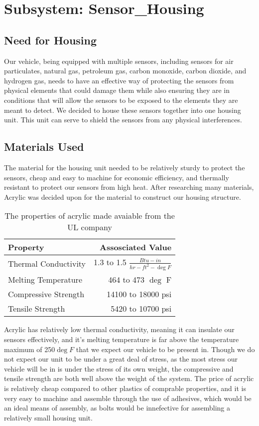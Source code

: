 \chapter{Subsystem: Sensor\_Housing}

\section{Need for Housing} Our vehicle, being equipped with multiple sensors, including sensors for air particulates, natural gas, petroleum gas, carbon monoxide, carbon dioxide, and hydrogen gas, needs to have an effective way of protecting the sensors from physical elements that could damage them while also ensuring they are in conditions that will allow the sensors to be exposed to the elements they are meant to detect. We decided to house these sensors together into one housing unit. This unit can serve to shield the sensors from any physical interferences.

\section{Materials Used} The material for the housing unit needed to be relatively sturdy to protect the sensors, cheap and easy to machine for economic efficiency, and thermally resistant to protect our sensors from high heat. After researching many materials, Acrylic was decided upon for the material to construct our housing structure.

\begin{table}
\centering
\begin{tabular}{l|r}
Property & Assosciated Value \\\hline
Thermal Conductivity & 1.3 to 1.5 $\frac{Btu-in}{hr-ft^2-\deg F}$ \\
Melting Temperature & 464 to 473 $\deg$ F \\
Compressive Strength & 14100 to 18000 psi \\
Tensile Strength & 5420 to 10700 psi \\
\end{tabular}
\caption{\label{tab:Acrylic Properties} The properties of acrylic made avaiable from the UL company \cite{UL}}
\end{table}

Acrylic has relatively low thermal conductivity, meaning it can insulate our sensors effectively, and it's melting temperature is far above the temperature maximum of 250$\deg F$ that we expect our vehicle to be present in. Though we do not expect our unit to be under a great deal of stress, as the most stress our vehicle will be in is under the stress of its own weight, the compressive and tensile strength are both well above the weight of the system. The price of acrylic is relatively cheap compared to other plastics of comprable properties, and it is very easy to machine and assemble through the use of adhesives, which would be an ideal means of assembly, as bolts would be innefective for assembling a relatively small housing unit.

